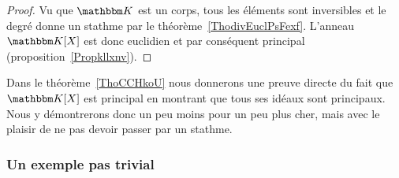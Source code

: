 \begin{proof}
    Vu que \( \eK\) est un corps, tous les éléments sont inversibles et le degré donne un stathme par le théorème~\ref{ThodivEuclPsFexf}. L'anneau \( \eK[X]\) est donc euclidien et par conséquent principal (proposition~\ref{Propkllxnv}).
\end{proof}

Dans le théorème~\ref{ThoCCHkoU} nous donnerons une preuve directe du fait que \( \eK[X]\) est principal en montrant que tous ses idéaux sont principaux. Nous y démontrerons donc un peu moins pour un peu plus cher, mais avec le plaisir de ne pas devoir passer par un stathme.

\subsubsection{Un exemple pas trivial}

